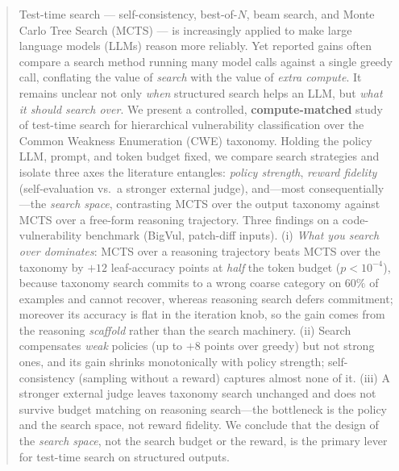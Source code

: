 \begin{abstract}
Test-time search --- self-consistency, best-of-$N$, beam search, and Monte Carlo
Tree Search (MCTS) --- is increasingly applied to make large language models (LLMs)
reason more reliably. Yet reported gains often compare a search method running
many model calls against a single greedy call, conflating the value of \emph{search}
with the value of \emph{extra compute}.
%
It remains unclear not only \emph{when} structured search helps an LLM, but
\emph{what it should search over}.
%
We present a controlled, \textbf{compute-matched} study of test-time search for
hierarchical vulnerability classification over the Common Weakness Enumeration
(CWE) taxonomy. Holding the policy LLM, prompt, and token budget fixed, we compare
search strategies and isolate three axes the literature entangles: \emph{policy
strength}, \emph{reward fidelity} (self-evaluation vs.\ a stronger external judge),
and---most consequentially---the \emph{search space}, contrasting MCTS over the
output taxonomy against MCTS over a free-form reasoning trajectory.
%
Three findings on a code-vulnerability benchmark (BigVul, patch-diff inputs).
(i) \emph{What you search over dominates}: MCTS over a reasoning trajectory beats
MCTS over the taxonomy by $+12$ leaf-accuracy points at \emph{half} the token
budget ($p{<}10^{-4}$), because taxonomy search commits to a wrong coarse
category on $60\%$ of examples and cannot recover, whereas reasoning search
defers commitment; moreover its accuracy is flat in the iteration knob, so the
gain comes from the reasoning \emph{scaffold} rather than the search machinery.
(ii) Search compensates \emph{weak} policies (up to $+8$ points over greedy) but
not strong ones, and its gain shrinks monotonically with policy strength;
self-consistency (sampling without a reward) captures almost none of it.
(iii) A stronger external judge leaves taxonomy search unchanged and does not
survive budget matching on reasoning search---the bottleneck is the policy and
the search space, not reward fidelity.
%
We conclude that the design of the \emph{search space}, not the search budget or
the reward, is the primary lever for test-time search on structured outputs.
\end{abstract}
